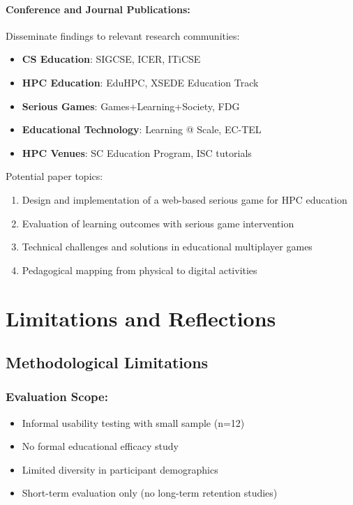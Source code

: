 \paragraph*{Conference and Journal Publications:}

Disseminate findings to relevant research communities:

\begin{itemize}
    \item \textbf{CS Education}: SIGCSE, ICER, ITiCSE
    \item \textbf{HPC Education}: EduHPC, XSEDE Education Track
    \item \textbf{Serious Games}: Games+Learning+Society, FDG
    \item \textbf{Educational Technology}: Learning @ Scale, EC-TEL
    \item \textbf{HPC Venues}: SC Education Program, ISC tutorials
\end{itemize}

Potential paper topics:
\begin{enumerate}
    \item Design and implementation of a web-based serious game for HPC education
    \item Evaluation of learning outcomes with serious game intervention
    \item Technical challenges and solutions in educational multiplayer games
    \item Pedagogical mapping from physical to digital activities
\end{enumerate}

\section{Limitations and Reflections}
\label{sec:limitations-reflections}

\subsection{Methodological Limitations}
\label{subsec:methodological-limitations}

\subsubsection{Evaluation Scope:}

\begin{itemize}
    \item Informal usability testing with small sample (n=12)
    \item No formal educational efficacy study
    \item Limited diversity in participant demographics
    \item Short-term evaluation only (no long-term retention studies)
\end{itemize}

